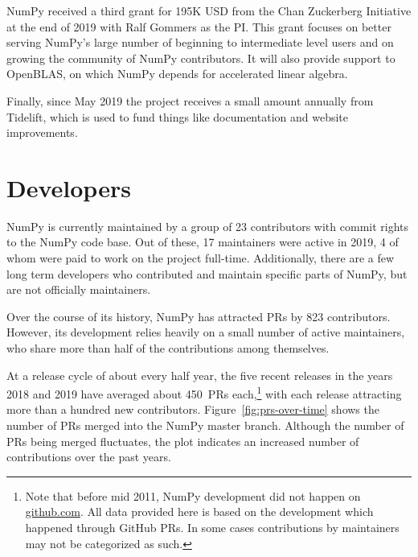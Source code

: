 NumPy received a third grant for 195K USD from the Chan Zuckerberg
Initiative at the end of 2019 with Ralf Gommers as the PI.
This grant focuses on better serving NumPy's large number of beginning
to intermediate level users and on growing the community of NumPy
contributors.
It will also provide support to OpenBLAS, on which NumPy depends for
accelerated linear algebra.

Finally, since May 2019 the project receives a small amount annually from
Tidelift, which is used to fund things like documentation and website
improvements.


\section*{Developers}

NumPy is currently maintained by a group of 23 contributors with commit rights
to the NumPy code base. Out of these, 17 maintainers were active in
2019, 4 of whom were paid to work on the project full-time.
Additionally, there are a few long term developers who contributed and maintain
specific parts of NumPy, but are not officially maintainers.

Over the course of its history, NumPy has attracted PRs by 823 contributors.
However, its development relies heavily on a small number
of active maintainers, who share more than half of the contributions among
themselves.

At a release cycle of about every half year, the five recent releases in the years
2018 and 2019 have averaged about 450~PRs each,\footnote{
    Note that before mid 2011, NumPy development did not happen on \url{github.com}.
    All data provided here is based on the development which happened through GitHub
    PRs. In some cases contributions by maintainers may not be categorized as such.}
with each release attracting more than a hundred new contributors.
Figure~\ref{fig:prs-over-time} shows the number of PRs merged into the NumPy
master branch.
Although the number of PRs being merged fluctuates,
the plot indicates an increased number of contributions over the past
years.

